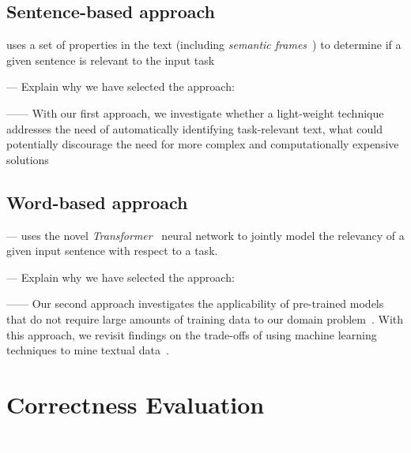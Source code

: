 \subsection{Sentence-based approach}


uses a set of properties in the text (including \textit{semantic frames}~\cite{fillmore1976frame}) to determine if a given sentence is relevant to the input task



--- Explain why we have selected the approach:

------ With our first approach, we investigate whether a light-weight technique addresses the need of automatically identifying task-relevant text, what could potentially discourage the need for more complex and computationally expensive solutions~\cite{Bavota2016}


\subsection{Word-based approach}


--- uses the novel \textit{Transformer}~\cite{Vaswani2017attention} neural network to jointly model the relevancy of a given input sentence with respect to a task. 

--- Explain why we have selected the approach:

------ Our second approach investigates the applicability of pre-trained models that do not require large amounts of training data to our domain problem~\cite{devlin2018bert, Ye2016}. With this approach, we revisit findings on the trade-offs of using machine learning techniques to mine textual data~\cite{Chaparro2017, Bavota2016}.



\clearpage



\section{Correctness Evaluation}
\textcolor{white}{force ident} %


